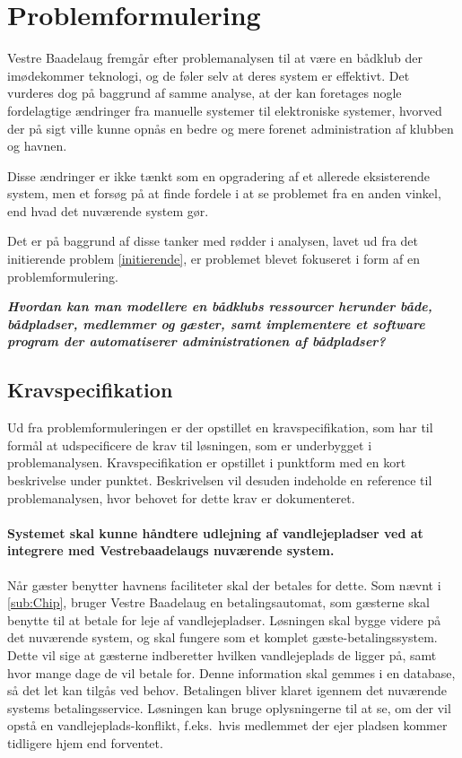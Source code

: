 \chapter{Problemformulering}
\label{cha:problemformulering}

Vestre Baadelaug fremgår efter problemanalysen til at være en bådklub der imødekommer teknologi, og de føler selv at deres system er effektivt. Det vurderes dog på baggrund af samme analyse, at der kan foretages nogle fordelagtige ændringer fra manuelle systemer til elektroniske systemer, hvorved der på sigt ville kunne opnås en bedre og mere forenet administration af klubben og havnen.

Disse ændringer er ikke tænkt som en opgradering af et allerede eksisterende system, men et forsøg på at finde fordele i at se problemet fra en anden vinkel, end hvad det nuværende system gør.

Det er på baggrund af disse tanker med rødder i analysen, lavet ud fra det initierende problem \ref{initierende}, er problemet blevet fokuseret i form af en problemformulering. 


\begin{displayquote}
\textbf{\textit{Hvordan kan man modellere en bådklubs ressourcer herunder både, bådpladser, medlemmer og gæster, samt implementere et software program der automatiserer administrationen af bådpladser?}}
\end{displayquote}

\section{Kravspecifikation} %
\label{sec:Kravspecifikation}

Ud fra problemformuleringen er der opstillet en kravspecifikation, som har til formål at udspecificere de krav til løsningen, som er underbygget i problemanalysen. Kravspecifikation er opstillet i punktform med en kort beskrivelse under punktet. Beskrivelsen vil desuden indeholde en reference til problemanalysen, hvor behovet for dette krav er dokumenteret.
 

  \subsubsection{Systemet skal kunne håndtere udlejning af vandlejepladser ved at integrere med Vestrebaadelaugs nuværende system.}
  Når gæster benytter havnens faciliteter skal der betales for dette. Som nævnt i \cref{sub:Chip}, bruger Vestre Baadelaug en betalingsautomat, som gæsterne skal benytte til at betale for leje af vandlejepladser. Løsningen skal bygge videre på det nuværende system, og skal fungere som et komplet gæste-betalingssystem. Dette vil sige at gæsterne indberetter hvilken vandlejeplads de ligger på, samt hvor mange dage de vil betale for. Denne information skal gemmes i en database, så det let kan tilgås ved behov. Betalingen bliver klaret igennem det nuværende systems betalingsservice. Løsningen kan bruge oplysningerne til at se, om der vil opstå en vandlejeplads-konflikt, f.eks.\ hvis medlemmet der ejer pladsen kommer tidligere hjem end forventet.

